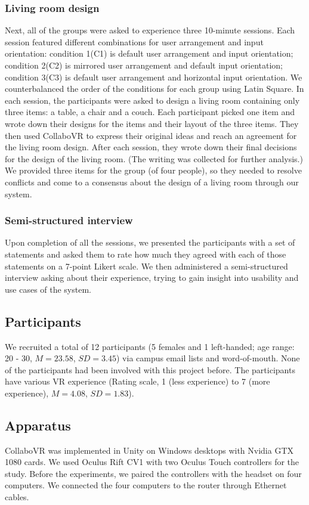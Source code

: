 \documentclass{sigchi}
\begin{document}
\subsubsection{Living room design}
Next, all of the groups were asked to experience three 10-minute sessions. 
Each session featured different combinations for user arrangement and input orientation: condition 1(C1) is default user arrangement and input orientation; condition 2(C2) is mirrored user arrangement and default input orientation; condition 3(C3) is default user arrangement and horizontal input orientation.
We counterbalanced the order of the conditions for each group using Latin Square. In each session, the participants were asked to design a living room  containing only three items: a table, a chair and a couch. 
Each participant picked one item and wrote down their designs for the items and their layout of the three items. They then used CollaboVR to express their original ideas and reach an agreement for the living room design. After each session, they wrote down their final decisions for the design of the living room. (The writing was collected for further analysis.)
We provided three items for the group (of four people), so they needed to resolve conflicts and come to a consensus about the design of a living room through our system.

\subsubsection{Semi-structured interview}
Upon completion of all the sessions, we presented the participants with a set of statements and asked them to rate how much they agreed with each of those statements on a 7-point Likert scale. We then administered a semi-structured interview asking about their experience, trying to gain insight into usability and use cases of the system.

\subsection{Participants}
We recruited a total of 12 participants (5 females and 1 left-handed; age range: 20 - 30, $M=23.58$, $SD=3.45$) via campus email lists and word-of-mouth. None of the participants had been involved with this project before. The participants have various VR experience (Rating scale, 1 (less experience) to 7 (more experience), $M=4.08$, $SD=1.83$).

\subsection{Apparatus}
CollaboVR was implemented in Unity on Windows desktops with Nvidia GTX 1080 cards. We used Oculus Rift CV1 with two Oculus Touch controllers for the study. Before the experiments, we paired the controllers with the headset on four computers. We connected the four computers to the router through Ethernet cables.
\end{document}
